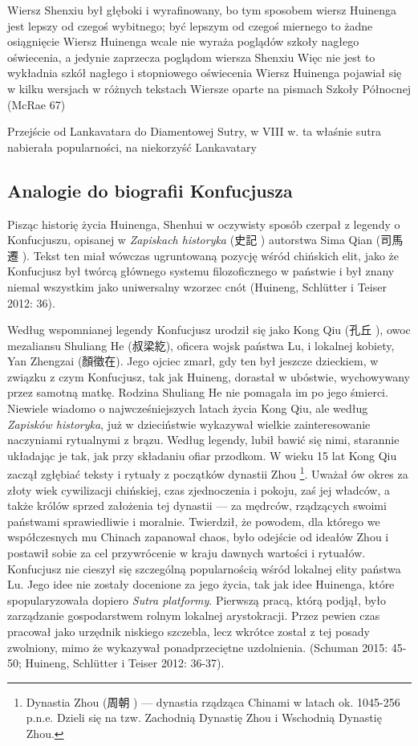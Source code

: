 Wiersz Shenxiu był głęboki i wyrafinowany, bo tym sposobem wiersz Huinenga jest lepszy od czegoś wybitnego; być lepszym od czegoś miernego to żadne osiągnięcie
Wiersz Huinenga wcale nie wyraża poglądów szkoły nagłego oświecenia, a jedynie zaprzecza poglądom wiersza Shenxiu
Więc nie jest to wykładnia szkół nagłego i stopniowego oświecenia
Wiersz Huinenga pojawiał się w kilku wersjach w różnych tekstach
Wiersze oparte na pismach Szkoły Północnej (McRae 67)

Przejście od Lankavatara do Diamentowej Sutry, w VIII w. ta właśnie sutra nabierała popularności, na niekorzyść Lankavatary
\fi
\subsection{Analogie do biografii Konfucjusza}
Pisząc historię życia Huinenga, Shenhui w oczywisty sposób czerpał z legendy o Konfucjuszu, opisanej w \textit{Zapiskach historyka} (史記 ) autorstwa Sima Qian (司馬遷 ). Tekst ten miał wówczas ugruntowaną pozycję wśród chińskich elit, jako że Konfucjusz był twórcą głównego systemu filozoficznego w państwie i był znany niemal wszystkim jako uniwersalny wzorzec cnót (Huineng, Schlütter i Teiser 2012: 36).

Według wspomnianej legendy Konfucjusz urodził się jako Kong Qiu (孔丘 ), owoc mezaliansu Shuliang He (叔梁紇), oficera wojsk państwa Lu, i lokalnej kobiety, Yan Zhengzai (顏徵在). Jego ojciec zmarł, gdy ten był jeszcze dzieckiem, w związku z czym Konfucjusz, tak jak Huineng, dorastał w ubóstwie, wychowywany przez samotną matkę. Rodzina Shuliang He nie pomagała im po jego śmierci. Niewiele wiadomo o najwcześniejszych latach życia Kong Qiu, ale według \textit{Zapisków historyka}, już w dzieciństwie wykazywał wielkie zainteresowanie naczyniami rytualnymi z brązu. Według legendy, lubił bawić się nimi, starannie układając je tak, jak przy składaniu ofiar przodkom. W wieku 15 lat Kong Qiu zaczął zgłębiać teksty i rytuały z początków dynastii Zhou%
\footnote{Dynastia Zhou (周朝 ) --- dynastia rządząca Chinami w latach ok. 1045-256 p.n.e. Dzieli się na tzw. Zachodnią Dynastię Zhou i Wschodnią Dynastię Zhou.}.
Uważał ów okres za złoty wiek cywilizacji chińskiej, czas zjednoczenia i pokoju, zaś jej władców, a także królów sprzed założenia tej dynastii --- za mędrców, rządzących swoimi państwami sprawiedliwie i moralnie.
Twierdził, że powodem, dla którego we współczesnych mu Chinach zapanował chaos, było odejście od ideałów Zhou i postawił sobie za cel przywrócenie w kraju dawnych wartości i rytuałów.
Konfucjusz nie cieszył się szczególną popularnością wśród lokalnej elity państwa Lu.
Jego idee nie zostały docenione za jego życia, tak jak idee Huinenga, które spopularyzowała dopiero \textit{Sutra platformy}.
Pierwszą pracą, którą podjął, było zarządzanie gospodarstwem rolnym lokalnej arystokracji.
Przez pewien czas pracował jako urzędnik niskiego szczebla, lecz wkrótce został z tej posady zwolniony, mimo że wykazywał ponadprzeciętne uzdolnienia.
(Schuman 2015: 45-50; Huineng, Schlütter i Teiser 2012: 36-37).

